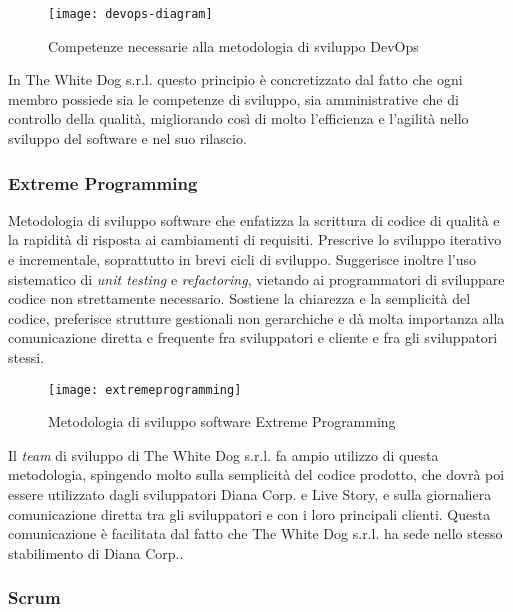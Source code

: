 \label{DevOps}
\begin{figure}[ht]
	\begin{center}
		\texttt{[image: devops-diagram]}
		\caption{Competenze necessarie alla metodologia di sviluppo DevOps}
	\end{center}
\end{figure}
\FloatBarrier

In The White Dog s.r.l. questo principio è concretizzato dal fatto che ogni membro possiede sia le competenze di sviluppo, sia amministrative che di controllo della qualità, migliorando così di molto l'efficienza e l'agilità nello sviluppo del software e nel suo rilascio.

\subsubsection{Extreme Programming}

Metodologia di sviluppo software che enfatizza la scrittura di codice di qualità e la rapidità di risposta ai cambiamenti di requisiti. Prescrive lo sviluppo iterativo e incrementale, soprattutto in brevi cicli di sviluppo. Suggerisce inoltre l'uso sistematico di \textit{unit testing} e \textit{refactoring}, vietando ai programmatori di sviluppare codice non strettamente necessario. Sostiene la chiarezza e la semplicità del codice, preferisce strutture gestionali non gerarchiche e dà molta importanza  alla comunicazione diretta e frequente fra sviluppatori e cliente e fra gli sviluppatori stessi. 

\label{Extreme Programming}
\begin{figure}[ht]
	\begin{center}
		\texttt{[image: extremeprogramming]}
		\caption{Metodologia di sviluppo software Extreme Programming}
	\end{center}
\end{figure}
\FloatBarrier

Il \textit{team} di sviluppo di The White Dog s.r.l. fa ampio utilizzo di questa metodologia, spingendo molto sulla semplicità del codice prodotto, che dovrà poi essere utilizzato dagli sviluppatori Diana Corp. e Live Story, e sulla giornaliera comunicazione diretta tra gli sviluppatori e con i loro principali clienti. Questa comunicazione è facilitata dal fatto che The White Dog s.r.l. ha sede nello stesso stabilimento di Diana Corp..

\subsubsection{Scrum}

